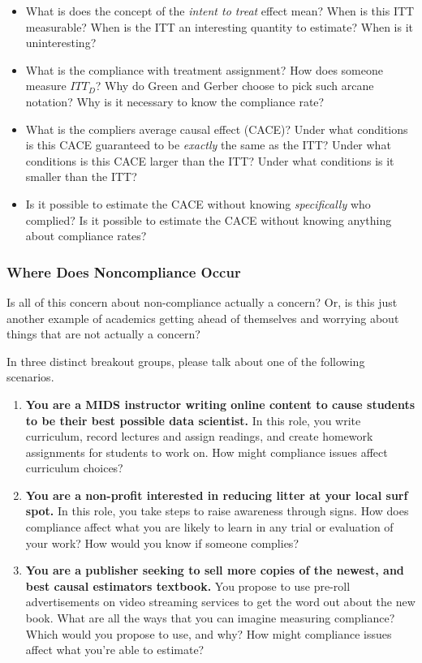 \documentclass[
]{article}
\providecommand{\tightlist}{%
  \setlength{\itemsep}{0pt}\setlength{\parskip}{0pt}}
\theoremstyle{definition}
\theoremstyle{definition}
\theoremstyle{definition}
\theoremstyle{definition}
\theoremstyle{remark}
\begin{document}
\begin{itemize}
\tightlist
\item
  What is does the concept of the \emph{intent to treat} effect mean? When is this ITT measurable? When is the ITT an interesting quantity to estimate? When is it uninteresting?\\
\item
  What is the compliance with treatment assignment? How does someone measure \(ITT_{D}\)? Why do Green and Gerber choose to pick such arcane notation? Why is it necessary to know the compliance rate?\\
\item
  What is the compliers average causal effect (CACE)? Under what conditions is this CACE guaranteed to be \emph{exactly} the same as the ITT? Under what conditions is this CACE larger than the ITT? Under what conditions is it smaller than the ITT?
\item
  Is it possible to estimate the CACE without knowing \emph{specifically} who complied? Is it possible to estimate the CACE without knowing anything about compliance rates?
\end{itemize}

\subsubsection{Where Does Noncompliance Occur}\label{where-does-noncompliance-occur}

Is all of this concern about non-compliance actually a concern? Or, is this just another example of academics getting ahead of themselves and worrying about things that are not actually a concern?

In three distinct breakout groups, please talk about one of the following scenarios.

\begin{enumerate}
\def\labelenumi{\arabic{enumi}.}
\tightlist
\item
  \textbf{You are a MIDS instructor writing online content to cause students to be their best possible data scientist.} In this role, you write curriculum, record lectures and assign readings, and create homework assignments for students to work on. How might compliance issues affect curriculum choices?
\item
  \textbf{You are a non-profit interested in reducing litter at your local surf spot.} In this role, you take steps to raise awareness through signs. How does compliance affect what you are likely to learn in any trial or evaluation of your work? How would you know if someone complies?
\item
  \textbf{You are a publisher seeking to sell more copies of the newest, and best causal estimators textbook.} You propose to use pre-roll advertisements on video streaming services to get the word out about the new book. What are all the ways that you can imagine measuring compliance? Which would you propose to use, and why? How might compliance issues affect what you're able to estimate?
\end{enumerate}
\end{document}
